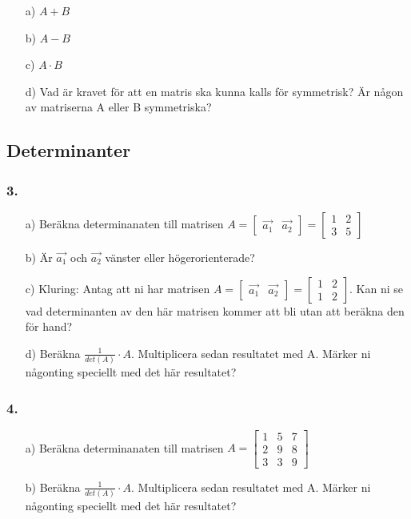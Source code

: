 \documentclass{article}
\begin{document}
\begin{itemize}
	\item[a) ] $A+B$
	\item[b) ] $A-B$
	\item[c) ] $A \cdot B$
	\item[d) ] Vad är kravet för att en matris ska kunna kalls för symmetrisk? Är någon av matriserna A eller B symmetriska?
\end{itemize}

\subsection*{Determinanter}
\subsubsection*{3.}
\begin{itemize}
	\item[a) ] Beräkna determinanaten till matrisen $A = \begin{bmatrix} \vec{a_1} & \vec{a_2}\end{bmatrix} =\begin{bmatrix}1 & 2 \\ 3 & 5\end{bmatrix}$
	\item[b) ] Är $\vec{a_1}$ och $\vec{a_2}$ vänster eller högerorienterade?
	\item[c) ] Kluring: Antag att ni har matrisen $A = \begin{bmatrix} \vec{a_1} & \vec{a_2}\end{bmatrix} =\begin{bmatrix}1 & 2 \\ 1 & 2\end{bmatrix}$. Kan ni se vad determinanten av den här matrisen kommer att bli utan att beräkna den för hand?
	\item[d) ] Beräkna $\frac{1}{det(A)} \cdot A$. Multiplicera sedan resultatet med A. Märker ni någonting speciellt med det här resultatet?
\end{itemize}

\subsubsection*{4.}
\begin{itemize}
	\item[a) ] Beräkna determinanaten till matrisen $A=\begin{bmatrix}1 & 5 & 7\\ 2 & 9 & 8 \\ 3 & 3 & 9\end{bmatrix}$ 
	\item[b) ] Beräkna $\frac{1}{det(A)} \cdot A$. Multiplicera sedan resultatet med A. Märker ni någonting speciellt med det här resultatet?
\end{itemize}
\end{document}
